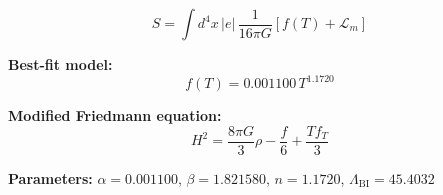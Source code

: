 
\begin{equation}
  S = \int d^4x \, |e| \, \frac{1}{16\pi G} \left[ f(T) + \mathcal{L}_m \right]
\end{equation}

\textbf{Best-fit model:}
\begin{equation}
  f(T) = 0.001100 \, T^{1.1720}
\end{equation}

\textbf{Modified Friedmann equation:}
\begin{equation}
  H^2 = \frac{8\pi G}{3} \rho - \frac{f}{6} + \frac{T f_T}{3}
\end{equation}

\textbf{Parameters:}
$\alpha = 0.001100$, \quad
$\beta = 1.821580$, \quad
$n = 1.1720$, \quad
$\Lambda_{\text{BI}} = 45.4032$